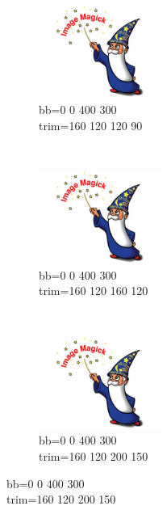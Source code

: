 \documentclass[french]{article}
\begin{document}
\begin{figure}[h]
\begin{subfigure}[b]{0.3\textwidth}
        \includegraphics[bb=0 0 400 300,trim=160 120 120 90,width=4cm,height=3cm,clip=true]{test.jpg}
        \caption{bb=0 0 400 300\\trim=160 120 120 90}%
        \label{essai_4}
    \end{subfigure}
    ~
    \begin{subfigure}[b]{0.3\textwidth}
        \includegraphics[bb=0 0 400 300,trim=160 120 160 120,width=4cm,height=3cm,clip=true]{test.jpg}
        \caption{bb=0 0 400 300\\trim=160 120 160 120}%
        \label{essai_5}
    \end{subfigure}
    ~
    \begin{subfigure}[b]{0.3\textwidth}
        \includegraphics[bb=0 0 400 300,trim=160 120 200 150,width=4cm,height=3cm,clip=true]{test.jpg}
        \caption{bb=0 0 400 300\\trim=160 120 200 150}%

\end{subfigure}
\end{figure}
\end{document}
